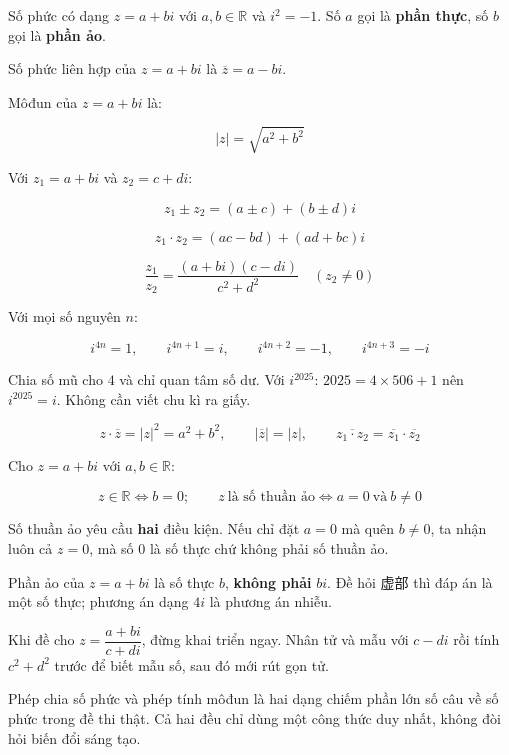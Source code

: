\documentclass[11pt, a4paper]{article}
\begin{document}
\begin{dinhnghia}
Số phức có dạng $z = a + bi$ với $a, b \in \mathbb{R}$ và $i^2 = -1$. Số $a$ gọi là \textbf{phần thực}, số $b$ gọi là \textbf{phần ảo}.
\end{dinhnghia}
\begin{dinhnghia}
Số phức liên hợp của $z = a + bi$ là $\overline{z} = a - bi$.
\end{dinhnghia}
\begin{dinhnghia}
Môđun của $z = a + bi$ là:

$$\lvert z \rvert = \sqrt{a^2 + b^2}$$
\end{dinhnghia}
\begin{dinhly}
Với $z_1 = a + bi$ và $z_2 = c + di$:

$$z_1 \pm z_2 = (a \pm c) + (b \pm d)i$$

$$z_1 \cdot z_2 = (ac - bd) + (ad + bc)i$$

$$\frac{z_1}{z_2} = \frac{(a + bi)(c - di)}{c^2 + d^2} \quad (z_2 \ne 0)$$
\end{dinhly}
\begin{dinhly}
Với mọi số nguyên $n$:

$$i^{4n} = 1, \qquad i^{4n+1} = i, \qquad i^{4n+2} = -1, \qquad i^{4n+3} = -i$$

 Chia số mũ cho $4$ và chỉ quan tâm số dư. Với $i^{2025}$: $2025 = 4 \times 506 + 1$ nên $i^{2025} = i$. Không cần viết chu kì ra giấy.
\end{dinhly}
\begin{dinhly}
$$z \cdot \overline{z} = \lvert z \rvert^2 = a^2 + b^2, \qquad \lvert \overline{z} \rvert = \lvert z \rvert, \qquad \overline{z_1 \cdot z_2} = \overline{z_1} \cdot \overline{z_2}$$
\end{dinhly}
\begin{dinhly}
Cho $z = a + bi$ với $a, b \in \mathbb{R}$:

$$z \in \mathbb{R} \iff b = 0; \qquad z \ \text{là số thuần ảo} \iff a = 0 \ \text{và} \ b \ne 0$$

 Số thuần ảo yêu cầu \textbf{hai} điều kiện. Nếu chỉ đặt $a = 0$ mà quên $b \ne 0$, ta nhận luôn cả $z = 0$, mà số $0$ là số thực chứ không phải số thuần ảo.

 Phần ảo của $z = a + bi$ là số thực $b$, \textbf{không phải} $bi$. Đề hỏi 虚部 thì đáp án là một số thực; phương án dạng $4i$ là phương án nhiễu.

 Khi đề cho $z = \dfrac{a + bi}{c + di}$, đừng khai triển ngay. Nhân tử và mẫu với $c - di$ rồi tính $c^2 + d^2$ trước để biết mẫu số, sau đó mới rút gọn tử.

 Phép chia số phức và phép tính môđun là hai dạng chiếm phần lớn số câu về số phức trong đề thi thật. Cả hai đều chỉ dùng một công thức duy nhất, không đòi hỏi biến đổi sáng tạo.

\end{dinhly}
\end{document}
